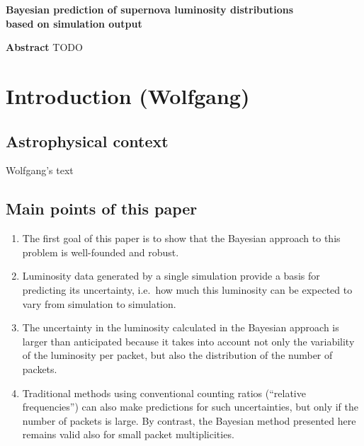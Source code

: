 \documentclass[11pt]{article}
\begin{document}
\begin{center}
  \textbf{\Large Bayesian prediction of supernova luminosity  distributions}\\[8pt]
  \textbf{\Large based on simulation output}\\[12pt]
\end{center}

\textbf{Abstract} TODO\\

\section{Introduction (Wolfgang)}

\subsection{Astrophysical context}

Wolfgang's text

\subsection*{Main points of this paper}

\begin{enumerate}
\item The first goal of this paper is to show that the Bayesian
  approach to this problem is well-founded and robust.

\item Luminosity data generated by a single simulation provide a
  basis for predicting its uncertainty, i.e.\ how much this luminosity
  can be expected to vary from simulation to simulation.

\item The uncertainty in the luminosity calculated in the Bayesian
  approach is larger than anticipated because it takes into account
  not only the variability of the luminosity per packet, but also the
  distribution of the number of packets.

\item Traditional methods using conventional counting ratios
  (``relative frequencies'') can also make predictions for such
  uncertainties, but only if the number of packets is large. By
  contrast, the Bayesian method presented here remains valid also for
  small packet multiplicities.

\end{enumerate}
\end{document}
